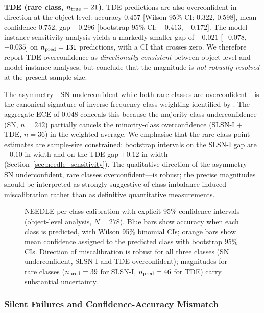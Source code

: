 \documentclass[twocolumn]{aastex631}
\begin{document}
\textbf{TDE (rare class, $n_{\rm true} = 21$).} TDE predictions are
also overconfident in direction at the object level: accuracy 0.457
[Wilson 95\% CI: 0.322, 0.598], mean confidence 0.752, gap $-0.296$
[bootstrap 95\% CI: $-0.413$, $-0.172$]. The model-instance sensitivity
analysis yields a markedly smaller gap of $-0.021$ [$-0.078$, $+0.035$]
on $n_{\rm pred} = 131$ predictions, with a CI that crosses zero. We
therefore report TDE overconfidence as \textit{directionally consistent}
between object-level and model-instance analyses, but conclude that
the magnitude is \textit{not robustly resolved} at the present
sample size.

The asymmetry---SN underconfident while both rare classes are overconfident---is the canonical signature of inverse-frequency class weighting identified by \citet{vandengoorbergh2022}. The aggregate ECE of 0.048 conceals this because the majority-class underconfidence (SN, $n = 242$) partially cancels the minority-class overconfidence (SLSN-I + TDE, $n = 36$) in the weighted average. We emphasise that the rare-class point estimates are sample-size constrained: bootstrap intervals on the SLSN-I gap are $\pm 0.10$ in width and on the TDE gap $\pm 0.12$ in width (Section~\ref{sec:needle_sensitivity}). The qualitative direction of the asymmetry---SN underconfident, rare classes overconfident---is robust; the precise magnitudes should be interpreted as strongly suggestive of class-imbalance-induced miscalibration rather than as definitive quantitative measurements.

\begin{figure}[t]
\caption{NEEDLE per-class calibration with explicit 95\% confidence
intervals (object-level analysis, $N = 278$). Blue bars show accuracy
when each class is predicted, with Wilson 95\% binomial CIs; orange
bars show mean confidence assigned to the predicted class with
bootstrap 95\% CIs. Direction of miscalibration is robust for all
three classes (SN underconfident, SLSN-I and TDE overconfident);
magnitudes for rare classes ($n_{\rm pred} = 39$ for SLSN-I,
$n_{\rm pred} = 46$ for TDE) carry substantial uncertainty.
\label{fig:needle_per_class_ci}}
\end{figure}

\subsubsection{Silent Failures and Confidence-Accuracy Mismatch} \label{sec:needle_silent}
\end{document}
